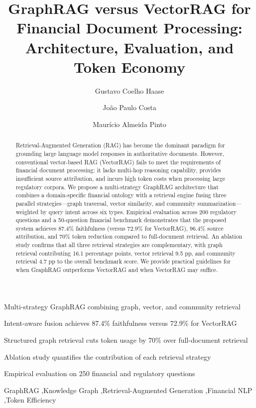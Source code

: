 \documentclass[review]{elsarticle}
\def\corref#1{}%
\begin{document}
\begin{frontmatter}

\title{GraphRAG versus VectorRAG for Financial Document Processing: Architecture, Evaluation, and Token Economy}

\author[inst1]{Gustavo Coelho Haase\corref{cor1}}

\author[inst1]{Jo\~{a}o Paulo Costa}

\author[inst1]{Maur\'{i}cio Almeida Pinto}


\begin{highlights}
\item Multi-strategy GraphRAG combining graph, vector, and community retrieval
\item Intent-aware fusion achieves 87.4\% faithfulness versus 72.9\% for VectorRAG
\item Structured graph retrieval cuts token usage by 70\% over full-document retrieval
\item Ablation study quantifies the contribution of each retrieval strategy
\item Empirical evaluation on 250 financial and regulatory questions
\end{highlights}

\begin{abstract}
Retrieval-Augmented Generation (RAG) has become the dominant paradigm for grounding large language model responses in authoritative documents. However, conventional vector-based RAG (VectorRAG) fails to meet the requirements of financial document processing: it lacks multi-hop reasoning capability, provides insufficient source attribution, and incurs high token costs when processing large regulatory corpora. We propose a multi-strategy GraphRAG architecture that combines a domain-specific financial ontology with a retrieval engine fusing three parallel strategies---graph traversal, vector similarity, and community summarization---weighted by query intent across six types. Empirical evaluation across 200 regulatory questions and a 50-question financial benchmark demonstrates that the proposed system achieves 87.4\% faithfulness (versus 72.9\% for VectorRAG), 96.4\% source attribution, and 70\% token reduction compared to full-document retrieval. An ablation study confirms that all three retrieval strategies are complementary, with graph retrieval contributing 16.1 percentage points, vector retrieval 9.5 pp, and community retrieval 4.7 pp to the overall benchmark score. We provide practical guidelines for when GraphRAG outperforms VectorRAG and when VectorRAG may suffice.
\end{abstract}

\begin{keyword}
GraphRAG \sep Knowledge Graph \sep Retrieval-Augmented Generation \sep Financial NLP \sep Token Efficiency
\end{keyword}

\end{frontmatter}
\end{document}
